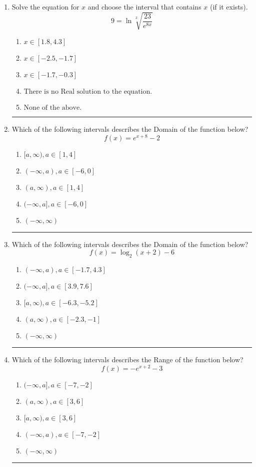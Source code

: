 \documentclass[14pt]{extbook}
\newcommand{\litem}[1]{\item#1\hspace*{-1cm}\rule{\textwidth}{0.4pt}}
\begin{document}
\begin{enumerate}
\litem{
 Solve the equation for $x$ and choose the interval that contains $x$ (if it exists).\[  9 = \ln{\sqrt[3]{\frac{23}{e^{8x}}}} \]\begin{enumerate}[label=\Alph*.]
\item \( x \in [1.8, 4.3] \)
\item \( x \in [-2.5, -1.7] \)
\item \( x \in [-1.7, -0.3] \)
\item \( \text{There is no Real solution to the equation.} \)
\item \( \text{None of the above.} \)

\end{enumerate} }
\litem{
Which of the following intervals describes the Domain of the function below?\[ f(x) = e^{x+8}-2 \]\begin{enumerate}[label=\Alph*.]
\item \( [a, \infty), a \in [1, 4] \)
\item \( (-\infty, a), a \in [-6, 0] \)
\item \( (a, \infty), a \in [1, 4] \)
\item \( (-\infty, a], a \in [-6, 0] \)
\item \( (-\infty, \infty) \)

\end{enumerate} }
\litem{
Which of the following intervals describes the Domain of the function below?\[ f(x) = \log_2{(x+2)}-6 \]\begin{enumerate}[label=\Alph*.]
\item \( (-\infty, a), a \in [-1.7, 4.3] \)
\item \( (-\infty, a], a \in [3.9, 7.6] \)
\item \( [a, \infty), a \in [-6.3, -5.2] \)
\item \( (a, \infty), a \in [-2.3, -1] \)
\item \( (-\infty, \infty) \)

\end{enumerate} }
\litem{
Which of the following intervals describes the Range of the function below?\[ f(x) = -e^{x+2}-3 \]\begin{enumerate}[label=\Alph*.]
\item \( (-\infty, a], a \in [-7, -2] \)
\item \( (a, \infty), a \in [3, 6] \)
\item \( [a, \infty), a \in [3, 6] \)
\item \( (-\infty, a), a \in [-7, -2] \)
\item \( (-\infty, \infty) \)


\end{enumerate}}
\end{enumerate}
\end{document}

